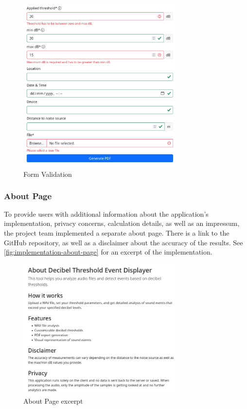 \begin{figure}[H]
    \centering
    \includegraphics[width=0.75\textwidth]{../assets/implementation_validation.png}
    \caption{Form Validation}\label{fig:implementation-validation}
\end{figure}

\subsubsection{About Page}\label{subsubsec:about-page}
To provide users with additional information about the application's implementation, privacy concerns, calculation details, as well as an impressum, the project team implemented
a separate about page. There is a link to the GitHub repository, as well as a disclaimer about the accuracy of the results. See \autoref{fig:implementation-about-page} for an excerpt of the implementation.
\begin{figure}[H]
    \centering
    \includegraphics[width=0.75\textwidth]{../assets/implementation_about_page.png}
    \caption{About Page excerpt}\label{fig:implementation-about-page}
\end{figure}

